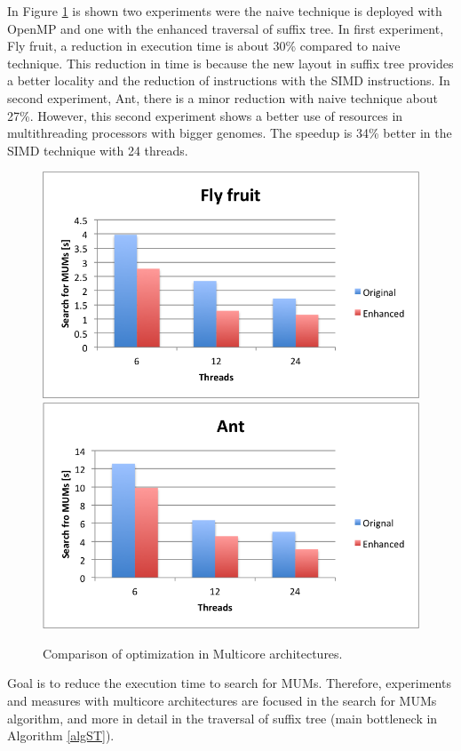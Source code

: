 \documentclass[conference]{IEEEtran}
\begin{document}
In Figure \ref{mthrd} is shown two experiments were the naive technique is deployed with OpenMP and one with the enhanced traversal of suffix tree. In first experiment, Fly fruit, a reduction in execution time is about 30\% compared to naive technique. This reduction in time is because the new layout in suffix tree provides a better locality and the reduction of instructions with the SIMD instructions. In second experiment, Ant, there is a minor reduction with naive technique about 27\%. However, this second experiment shows a better use of resources in multithreading processors with bigger genomes. The speedup is 34\% better in the SIMD technique with 24 threads.
\begin{figure}[hbtp]
\centering
\includegraphics[scale=0.5]{multithread1.png}
\includegraphics[scale=0.5]{multithread2.png}
\caption{Comparison of optimization in Multicore architectures.}
\label{mthrd}
\end{figure}
Goal is to reduce the execution time to search for MUMs. Therefore, experiments and measures with multicore architectures are focused in the search for MUMs algorithm, and more in detail in the traversal of suffix tree (main bottleneck in Algorithm \ref{algST}).
\end{document}

